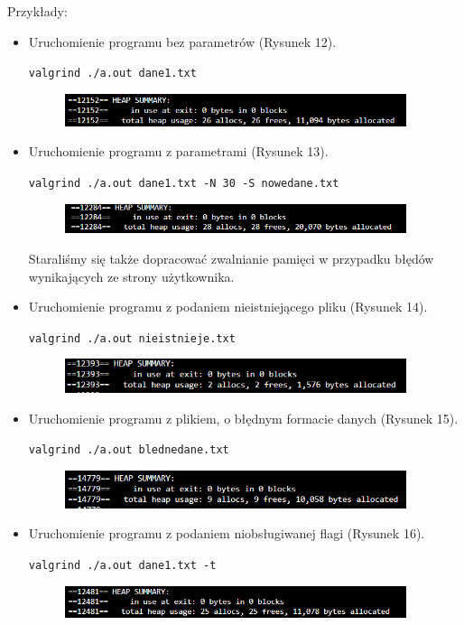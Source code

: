 \documentclass{article}
\begin{document}
Przykłady:
\begin{itemize}
\item Uruchomienie programu bez parametrów (Rysunek 12).

\texttt{valgrind ./a.out dane1.txt}
\begin{figure}[h]
\centering
\includegraphics[width=10cm]{1.2.png}
\caption{}
\label{fig:1.2.png}
\end{figure}


\item Uruchomienie programu z parametrami (Rysunek 13).

\texttt{valgrind ./a.out dane1.txt -N 30 -S nowedane.txt}
\begin{figure}[h]
\centering
\includegraphics[width=10cm]{2.2.png}
\caption{}
\label{fig:2.2.png}
\end{figure}



Staraliśmy się także dopracować zwalnianie pamięci w przypadku błędów wynikających ze strony użytkownika.

\item Uruchomienie programu z podaniem nieistniejącego pliku (Rysunek 14).

\texttt{valgrind ./a.out nieistnieje.txt}
\begin{figure}[h]
\centering
\includegraphics[width=10cm]{3.2.png}
\caption{}
\label{fig:3.2.png}
\end{figure}

\item Uruchomienie programu z plikiem, o błędnym formacie danych (Rysunek 15).

\texttt{valgrind ./a.out blednedane.txt}
\begin{figure}[h]
\centering
\includegraphics[width=10cm]{5.2.png}
\caption{}
\label{fig:4.2.png}
\end{figure}

\newpage
\item Uruchomienie programu z podaniem niobsługiwanej flagi (Rysunek 16).

\texttt{valgrind ./a.out dane1.txt -t}
\begin{figure}[h]
\centering
\includegraphics[width=10cm]{4.2.png}
\caption{}
\label{fig:5.2.png}
\end{figure}




\end{itemize}
\end{document}
